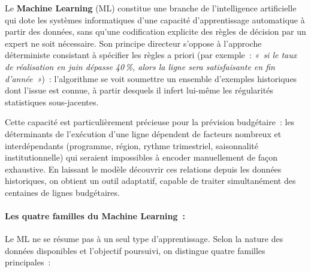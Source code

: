 Le \textbf{Machine Learning} (ML) constitue une branche de l'intelligence artificielle
qui dote les systèmes informatiques d'une capacité d'apprentissage automatique
à partir des données, sans qu'une codification explicite des règles de décision
par un expert ne soit nécessaire. Son principe directeur s'oppose à l'approche
déterministe consistant à spécifier les règles a priori (par exemple~: \textit{«~si
le taux de réalisation en juin dépasse 40\,\%, alors la ligne sera satisfaisante en fin
d'année~»})~: l'algorithme se voit soumettre un ensemble d'exemples historiques dont
l'issue est connue, à partir desquels il infert lui-même les régularités statistiques
sous-jacentes.

Cette capacité est particulièrement précieuse pour la prévision budgétaire~: les
déterminants de l'exécution d'une ligne dépendent de facteurs nombreux et
interdépendants (programme, région, rythme trimestriel, saisonnalité institutionnelle)
qui seraient impossibles à encoder manuellement de façon exhaustive. En laissant
le modèle découvrir ces relations depuis les données historiques, on obtient un outil
adaptatif, capable de traiter simultanément des centaines de lignes budgétaires.

\paragraph{Les quatre familles du Machine Learning~:}

Le ML ne se résume pas à un seul type d'apprentissage. Selon la nature des données
disponibles et l'objectif poursuivi, on distingue quatre familles principales~:

